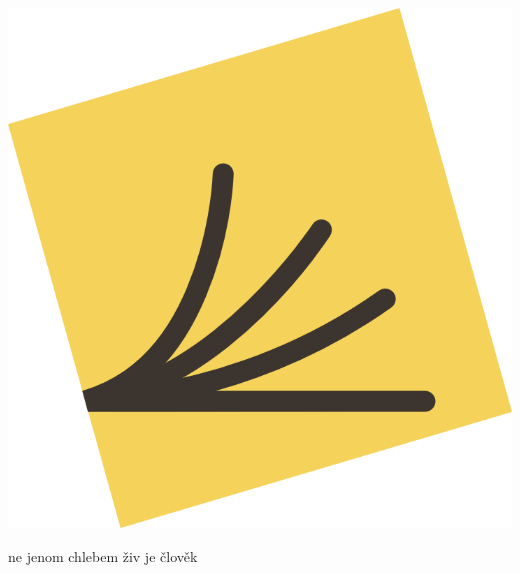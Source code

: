 \documentclass[a3]{a0poster}
\begin{document}
~

\medskip
\bigskip
\bigskip


\hrulefill

\medskip

\begin{minipage}{0.34\textwidth}
\includegraphics[width=\textwidth]{logo.png}
\end{minipage}
\begin{minipage}{0.64\textwidth}
\end{minipage}

\medskip

\hrulefill

\medskip

{\Large \textsf{ne jenom chlebem živ je člověk}}
\end{document}
